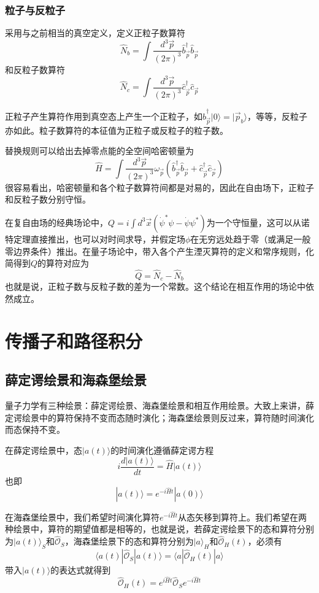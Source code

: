 \documentclass[a4paper,11pt]{ctexart}
\newcommand{\beq}{\begin{equation}}
\newcommand{\eeq}{\end{equation}}
\newcommand{\op}{\hat{\mathcal{O}}}
\begin{document}
\subsubsection{粒子与反粒子}
采用与之前相当的真空定义，定义正粒子数算符
\beq
\hat{N}_b = \int \frac{d^3 \vec{p}}{(2\pi)^3}   \hat{b}_{\vec{p}}^\dagger \hat{b}_{\vec{p}}
\eeq
和反粒子数算符
\beq
\hat{N}_c = \int \frac{d^3 \vec{p}}{(2\pi)^3} \hat{c}_{\vec{p}}^\dagger \hat{c}_{\vec{p}}
\eeq
\par
正粒子产生算符作用到真空态上产生一个正粒子，如$\hat{b}_{\vec{p}}^\dagger |0\rangle = |\vec{p}_b \rangle$，等等，反粒子亦如此。粒子数算符的本征值为正粒子或反粒子的粒子数。
\par
替换规则可以给出去掉零点能的全空间哈密顿量为
\beq \label{complexham}
\hat{H} = \int \frac{d^3 \vec{p}}{(2\pi)^3} \omega_{\vec{p}} (\hat{b}_{\vec{p}}^\dagger \hat{b}_{\vec{p}} +\hat{c}_{\vec{p}}^\dagger \hat{c}_{\vec{p}})
\eeq
很容易看出，哈密顿量和各个粒子数算符间都是对易的，因此在自由场下，正粒子和反粒子数分别守恒。
\par
在复自由场的经典场论中，$Q = i \int d^3 \vec{x} (\dot{\psi}^* \psi - \dot{\psi} \psi^*)$为一个守恒量，这可以从诺特定理直接推出，也可以对时间求导，并假定场$\phi$在无穷远处趋于零（或满足一般零边界条件）推出。在量子场论中，带入各个产生湮灭算符的定义和常序规则，化简得到$Q$的算符对应为
\beq
\hat{Q} = \hat{N}_c - \hat{N}_b
\eeq
也就是说，正粒子数与反粒子数的差为一个常数。这个结论在相互作用的场论中依然成立。

\section{传播子和路径积分}
\subsection{薛定谔绘景和海森堡绘景}
量子力学有三种绘景：薛定谔绘景、海森堡绘景和相互作用绘景。大致上来讲，薛定谔绘景中的算符保持不变而态随时演化；海森堡绘景则反过来，算符随时间演化而态保持不变。\par
在薛定谔绘景中，态$|a(t) \rangle$的时间演化遵循薛定谔方程
\beq
i \frac{d |a(t) \rangle}{dt} = \hat{H}| a(t) \rangle
\eeq
也即
\beq
|a(t)\rangle =  e^{- i \hat{H} t} |a(0)\rangle
\eeq
\par
在海森堡绘景中，我们希望时间演化算符$e^{- i \hat{H} t}$从态矢移到算符上。我们希望在两种绘景中，算符的期望值都是相等的，也就是说，若薛定谔绘景下的态和算符分别为$|a(t) \rangle_S$和$\op_S$，海森堡绘景下的态和算符分别为$|a \rangle_H$和$\op_H(t)$，必须有
\beq
\langle a(t) |\op_S |a(t) \rangle = \langle a|\op_H(t)|a \rangle
\eeq
带入$| a(t) \rangle$的表达式就得到
\beq
\op_H(t) = e^{i \hat{H} t} \op_S e^{-i \hat{H} t}
\eeq
\end{document}
